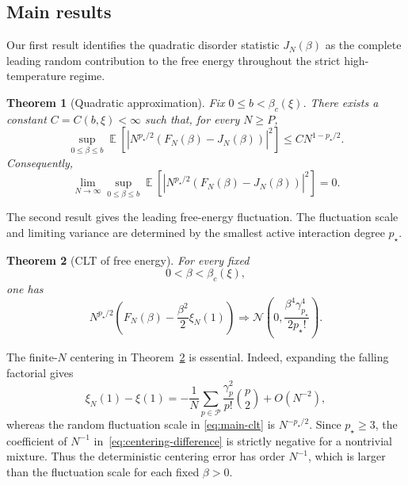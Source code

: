 \documentclass[letterpaper,11pt,reqno]{amsart}
\newtheorem{thm}{Theorem}[section]
\renewcommand{\leq}{\leqslant}
\renewcommand{\geq}{\geqslant}
\newcommand{\cP}{\mathcal{P}}\newcommand{\cQ}{\mathcal{Q}}\newcommand{\cR}{\mathcal{R}}
\DeclareMathOperator{\E}{\mathds{E}}
\begin{document}
\subsection{Main results}
\label{subsec:main-results}

Our first result identifies the quadratic disorder statistic
$J_N(\beta)$ as the complete leading random contribution to the free
energy throughout the strict high-temperature regime.

\begin{thm}[Quadratic approximation]
\label{thm:quadratic-approximation}
Fix $0\leq b<\beta_c(\xi)$. There exists a constant
$C=C(b,\xi)<\infty$ such that, for every $N\geq P$,
\begin{equation}
\sup_{0\leq\beta\leq b}
\E
\left[
\left|
N^{p_\star/2}
\left(
F_N(\beta)-J_N(\beta)
\right)
\right|^2
\right]
\leq
C N^{1-p_\star/2}.
\label{eq:quadratic-approximation-rate}
\end{equation}
Consequently,
\begin{equation}
\lim_{N\to\infty}
\sup_{0\leq\beta\leq b}
\E
\left[
\left|
N^{p_\star/2}
\left(
F_N(\beta)-J_N(\beta)
\right)
\right|^2
\right]
=
0.
\label{eq:quadratic-approximation-limit}
\end{equation}
\end{thm}

The second result gives the leading free-energy fluctuation.  The
fluctuation scale and limiting variance are determined by the smallest
active interaction degree $p_\star$.

\begin{thm}[CLT of free energy]
\label{thm:main-clt}
For every fixed
\[
0<\beta<\beta_c(\xi),
\]
one has
\begin{equation}
N^{p_\star/2}
\left(
F_N(\beta)
-
\frac{\beta^2}{2}\xi_N(1)
\right)
\Longrightarrow
\mathcal N
\left(
0,
\frac{\beta^4\gamma_{p_\star}^4}{2p_\star!}
\right).
\label{eq:main-clt}
\end{equation}
\end{thm}

The finite-$N$ centering in Theorem~\ref{thm:main-clt} is essential.
Indeed, expanding the falling factorial gives
\begin{equation}
\xi_N(1)-\xi(1)
=-\frac1N\sum_{p\in\cP}\frac{\gamma_p^2}{p!}\binom p2+O(N^{-2}),
\label{eq:centering-difference}
\end{equation}
whereas the random fluctuation scale in
\eqref{eq:main-clt} is $N^{-p_\star/2}$.  Since $p_\star\geq 3$, the
coefficient of $N^{-1}$ in~\eqref{eq:centering-difference} is strictly negative for a nontrivial mixture. Thus the deterministic centering error has order $N^{-1}$, which is larger than the fluctuation scale for each fixed $\beta>0$.
\end{document}
